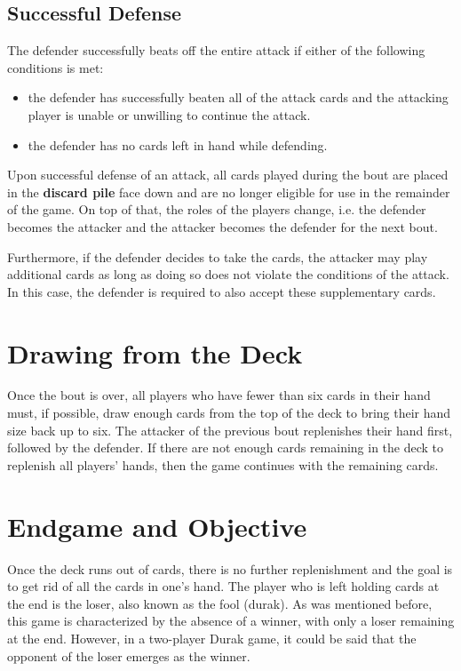 \subsection{Successful Defense}
The defender successfully beats off the entire attack if either of the following conditions is met:
\begin{itemize}
    \item the defender has successfully beaten all of the attack cards and the attacking player is unable or unwilling to continue the attack.
    \item the defender has no cards left in hand while defending.
\end{itemize}

Upon successful defense of an attack, all cards played during the bout are placed in the \textbf{discard pile} face down and are no longer eligible for use in the remainder of the game. On top of that, the roles of the players change, i.e. the defender becomes the attacker and the attacker becomes the defender for the next bout.

Furthermore, if the defender decides to take the cards, the attacker may play additional cards as long as doing so does not violate the conditions of the attack. In this case, the defender is required to also accept these supplementary cards.

\section{Drawing from the Deck}
Once the bout is over, all players who have fewer than six cards in their hand must, if possible, draw enough cards from the top of the deck to bring their hand size back up to six. The attacker of the previous bout replenishes their hand first, followed by the defender. If there are not enough cards remaining in the deck to replenish all players' hands, then the game continues with the remaining cards.

\section{Endgame and Objective}
Once the deck runs out of cards, there is no further replenishment and the goal is to get rid of all the cards in one's hand. The player who is left holding cards at the end is the loser, also known as the fool (durak). As was mentioned before, this game is characterized by the absence of a winner, with only a loser remaining at the end. However, in a two-player Durak game, it could be said that the opponent of the loser emerges as the winner.

